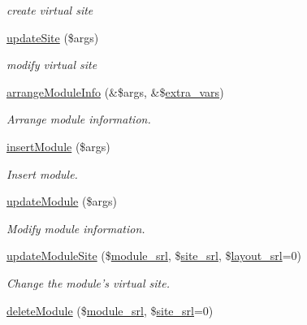 \begin{DoxyCompactItemize}
\begin{DoxyCompactList}\small\item\em create virtual site \end{DoxyCompactList}\item 
\hyperlink{classmoduleController_ae2fb61c8a558f0552202c51d2055eede}{update\-Site} (\$args)
\begin{DoxyCompactList}\small\item\em modify virtual site \end{DoxyCompactList}\item 
\hyperlink{classmoduleController_a4c5f4174ead13e475ea863184bf657d6}{arrange\-Module\-Info} (\&\$args, \&\$\hyperlink{ko_8install_8php_ae1dcb37fc34a8f312d2e6abd6f806743}{extra\-\_\-vars})
\begin{DoxyCompactList}\small\item\em Arrange module information. \end{DoxyCompactList}\item 
\hyperlink{classmoduleController_a8876924470cbfa94679d73dc6fc61332}{insert\-Module} (\$args)
\begin{DoxyCompactList}\small\item\em Insert module. \end{DoxyCompactList}\item 
\hyperlink{classmoduleController_ae4a1e785f41aa56a626b7f72346bbe0c}{update\-Module} (\$args)
\begin{DoxyCompactList}\small\item\em Modify module information. \end{DoxyCompactList}\item 
\hyperlink{classmoduleController_a9b1b3b8db4047c33882a9231c5eafb13}{update\-Module\-Site} (\$\hyperlink{ko_8install_8php_a370bb6450fab1da3e0ed9f484a38b761}{module\-\_\-srl}, \$\hyperlink{ko_8install_8php_a8b1406b4ad1048041558dce6bfe89004}{site\-\_\-srl}, \$\hyperlink{ko_8install_8php_a70054876db09b2519a1726663c8dd9e7}{layout\-\_\-srl}=0)
\begin{DoxyCompactList}\small\item\em Change the module's virtual site. \end{DoxyCompactList}\item 
\hyperlink{classmoduleController_add52eeb3f4a3cb900376af8007c09655}{delete\-Module} (\$\hyperlink{ko_8install_8php_a370bb6450fab1da3e0ed9f484a38b761}{module\-\_\-srl}, \$\hyperlink{ko_8install_8php_a8b1406b4ad1048041558dce6bfe89004}{site\-\_\-srl}=0)
\item 

\end{DoxyCompactItemize}

